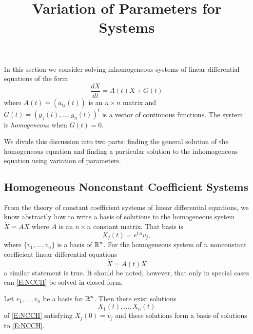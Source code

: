 \documentclass{ximera}
\title{Variation of Parameters for Systems}
\begin{document}
\begin{abstract}
\end{abstract}
\maketitle


\label{sec:LinInhomSys}

In this section we consider solving inhomogeneous systems of linear
differential equations  of the form
\arraystart
\begin{equation}  \label{eq:linihsys}
\frac{dX}{dt}  =  A(t)X + G(t) 
\end{equation}
\arrayfinish
where $A(t)=(a_{ij}(t))$ is an $n\times n$ matrix and
$G(t)=(g_1(t),\ldots,g_n(t))^t$ is a vector of continuous functions.  
The system is {\em homogeneous\/} when $G(t)=0$.

We divide this discussion into two parts: finding the 
general solution 
of the homogeneous equation and finding 
a particular 
solution to the 
inhomogeneous equation using variation of parameters.

\subsection*{Homogeneous Nonconstant Coefficient Systems}

From the theory of constant coefficient systems of linear differential 
equations, we know abstractly how to write  a  basis of solutions to
the homogeneous system  $\dot{X}=AX$ where $A$ is an $n\times n$
constant matrix.  That basis is 
\[
X_j(t) = e^{tA}v_j,
\]
where $\{v_1,\ldots,v_n\}$ is a basis of $\mbox{$\Bbb{R}$}^n$.  For the 
homogeneous 
system of $n$ nonconstant coefficient linear differential equations
\begin{equation}  \label{E:NCCH}
\dot{X} = A(t) X
\end{equation}
a similar statement is true.   It should be noted, however, that only in 
special cases can \eqref{E:NCCH} be solved in closed form.

\begin{proposition}  \label{P:NCCH}
Let $v_1,\ldots,v_n$ be a basis 
for $\mbox{$\Bbb{R}$}^n$.  Then there exist solutions 
\[
X_1(t),\ldots,X_n(t)
\]
of \eqref{E:NCCH} satisfying $X_j(0)=v_j$ and these
solutions form a basis of solutions 
to \eqref{E:NCCH}.
\end{proposition}
\end{document}
